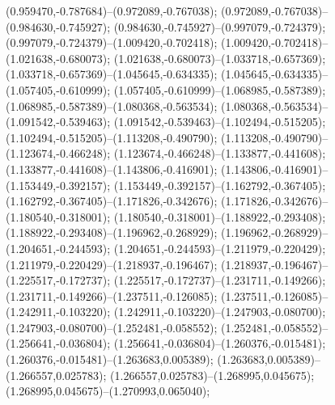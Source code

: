  (0.959470,-0.787684)--(0.972089,-0.767038);
 (0.972089,-0.767038)--(0.984630,-0.745927);
 (0.984630,-0.745927)--(0.997079,-0.724379);
 (0.997079,-0.724379)--(1.009420,-0.702418);
 (1.009420,-0.702418)--(1.021638,-0.680073);
 (1.021638,-0.680073)--(1.033718,-0.657369);
 (1.033718,-0.657369)--(1.045645,-0.634335);
 (1.045645,-0.634335)--(1.057405,-0.610999);
 (1.057405,-0.610999)--(1.068985,-0.587389);
 (1.068985,-0.587389)--(1.080368,-0.563534);
 (1.080368,-0.563534)--(1.091542,-0.539463);
 (1.091542,-0.539463)--(1.102494,-0.515205);
 (1.102494,-0.515205)--(1.113208,-0.490790);
 (1.113208,-0.490790)--(1.123674,-0.466248);
 (1.123674,-0.466248)--(1.133877,-0.441608);
 (1.133877,-0.441608)--(1.143806,-0.416901);
 (1.143806,-0.416901)--(1.153449,-0.392157);
 (1.153449,-0.392157)--(1.162792,-0.367405);
 (1.162792,-0.367405)--(1.171826,-0.342676);
 (1.171826,-0.342676)--(1.180540,-0.318001);
 (1.180540,-0.318001)--(1.188922,-0.293408);
 (1.188922,-0.293408)--(1.196962,-0.268929);
 (1.196962,-0.268929)--(1.204651,-0.244593);
 (1.204651,-0.244593)--(1.211979,-0.220429);
 (1.211979,-0.220429)--(1.218937,-0.196467);
 (1.218937,-0.196467)--(1.225517,-0.172737);
 (1.225517,-0.172737)--(1.231711,-0.149266);
 (1.231711,-0.149266)--(1.237511,-0.126085);
 (1.237511,-0.126085)--(1.242911,-0.103220);
 (1.242911,-0.103220)--(1.247903,-0.080700);
 (1.247903,-0.080700)--(1.252481,-0.058552);
 (1.252481,-0.058552)--(1.256641,-0.036804);
 (1.256641,-0.036804)--(1.260376,-0.015481);
 (1.260376,-0.015481)--(1.263683,0.005389);
 (1.263683,0.005389)--(1.266557,0.025783);
 (1.266557,0.025783)--(1.268995,0.045675);
 (1.268995,0.045675)--(1.270993,0.065040);
